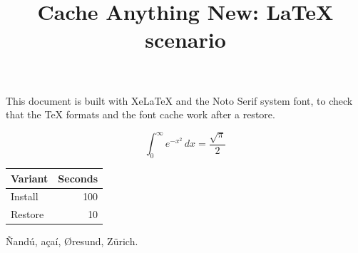 \documentclass[11pt]{article}
\title{Cache Anything New: \LaTeX{} scenario}
\date{}
\begin{document}
\maketitle

This document is built with Xe\LaTeX{} and the Noto Serif system font, to check that the
\TeX{} formats and the font cache work after a restore.

\begin{equation}
  \int_0^\infty e^{-x^2}\,dx = \frac{\sqrt{\pi}}{2}
\end{equation}

\begin{table}[h]
  \centering
  \begin{tabular}{lr}
    \toprule
    Variant & Seconds \\
    \midrule
    Install & 100 \\
    Restore & 10 \\
    \bottomrule
  \end{tabular}
\end{table}

Ñandú, açaí, Øresund, Zürich.
\end{document}

